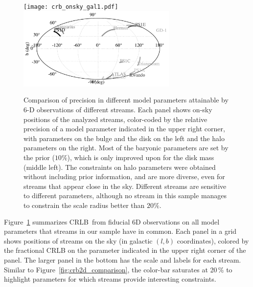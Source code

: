 \documentclass[modern]{aastex61}
\newcommand{\acronym}[1]{{\small{#1}}}
\newcommand{\CRLB}{\acronym{CRLB}}
\begin{document}
\begin{figure}
\begin{center}
\texttt{[image: crb\_onsky\_gal1.pdf]}
\includegraphics[width=0.7\textwidth]{sky_legend_gal1.pdf}
\caption{Comparison of precision in different model parameters attainable by 6-D observations of different streams.
Each panel shows on-sky positions of the analyzed streams, color-coded by the relative precision of a model parameter indicated in the upper right corner, with parameters on the bulge and the disk on the left and the halo parameters on the right.
Most of the baryonic parameters are set by the prior ($10\%$), which is only improved upon for the disk mass (middle left).
The constraints on halo parameters were obtained without including prior information, and are more diverse, even for streams that appear close in the sky.
Different streams are sensitive to different parameters, although no stream in this sample manages to constrain the scale radius better than $20\%$.
}
\label{fig:sky_precision}
\end{center}
\end{figure}

Figure~\ref{fig:sky_precision} summarizes \CRLB\ from fiducial 6D observations on all model parameters that streams in our sample have in common.
Each panel in a grid shows positions of streams on the sky (in galactic $(l,b)$ coordinates), colored by the fractional CRLB on the parameter indicated in the upper right corner of the panel.
The larger panel in the bottom has the scale and labels for each stream.
Similar to Figure~\ref{fig:crb2d_comparison}, the color-bar saturates at 20\,\% to highlight parameters for which streams provide interesting constraints.
\end{document}
